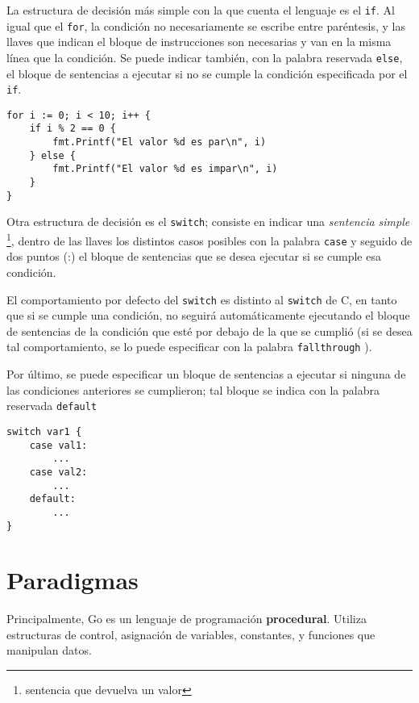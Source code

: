 La estructura de decisión más simple con la que cuenta el lenguaje es el \texttt{if}. Al igual que el \texttt{for}, la condición no necesariamente se escribe entre paréntesis, y las llaves que indican el bloque de instrucciones son necesarias y van en la misma línea que la condición. Se puede indicar también, con la palabra reservada \texttt{else}, el bloque de sentencias a ejecutar si no se cumple la condición especificada por el \texttt{if}.  

\vspace*{5mm}
\begin{lstlisting}[title=Ejemplo de varias estructuras de control]
for i := 0; i < 10; i++ {
    if i % 2 == 0 {
        fmt.Printf("El valor %d es par\n", i)
    } else {
        fmt.Printf("El valor %d es impar\n", i)
    }
}
\end{lstlisting}

Otra estructura de decisión es el \texttt{switch}; consiste en indicar una \emph{sentencia simple} \footnote{sentencia que devuelva un valor}, dentro de las llaves los distintos casos posibles con la palabra \texttt{case} y seguido de dos puntos (:) el bloque de sentencias que se desea ejecutar si se cumple esa condición. 

El comportamiento por defecto del \texttt{switch} es distinto al \texttt{switch} de C, en tanto que si se cumple una condición, no seguirá automáticamente ejecutando el bloque de sentencias de la condición que esté por debajo de la que se cumplió (si se desea tal comportamiento, se lo puede especificar con la palabra \texttt{fallthrough} \autocite{TheWayToGo}).

Por último, se puede especificar un bloque de sentencias a ejecutar si ninguna de las condiciones anteriores se cumplieron; tal bloque se indica con la palabra reservada \texttt{default} 

\begin{lstlisting}[title=Estructura de decisión múltiple \texttt{switch}]
switch var1 {
    case val1:
        ...
    case val2:
        ...
    default:
        ...
}
\end{lstlisting}


\section{Paradigmas}

Principalmente, Go es un lenguaje de programación \textbf{procedural}. Utiliza estructuras de control, asignación de variables, constantes, y funciones que manipulan datos.

